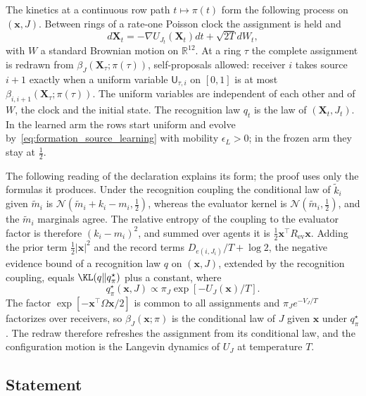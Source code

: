 \begin{definition}
The kinetics at a continuous row path $t\mapsto\pi(t)$ form the following process on $(\mathbf x,J)$. Between rings of a rate-one Poisson clock the assignment is held and
\[
d\mathbf X_t=-\nabla U_{J_t}(\mathbf X_t)dt+\sqrt{2T}dW_t,
\]
with $W$ a standard Brownian motion on $\mathbb R^{12}$. At a ring $\tau$ the complete assignment is redrawn from $\beta_J(\mathbf X_\tau;\pi(\tau))$, self-proposals allowed: receiver $i$ takes source $i+1$ exactly when a uniform variable $\mathsf U_{\tau,i}$ on $[0,1]$ is at most $\beta_{i,i+1}(\mathbf X_\tau;\pi(\tau))$. The uniform variables are independent of each other and of $W$, the clock and the initial state. The recognition law $q_t$ is the law of $(\mathbf X_t,J_t)$. In the learned arm the rows start uniform and evolve by~\eqref{eq:formation_source_learning} with mobility $\epsilon_L>0$; in the frozen arm they stay at $\frac12$.
\end{definition}

The following reading of the declaration explains its form; the proof uses only the formulas it produces. Under the recognition coupling the conditional law of $\tilde k_i$ given $\tilde m_i$ is $\mathcal N(\tilde m_i+k_i-m_i,\frac12)$, whereas the evaluator kernel is $\mathcal N(\tilde m_i,\frac12)$, and the $\tilde m_i$ marginals agree. The relative entropy of the coupling to the evaluator factor is therefore $(k_i-m_i)^2$, and summed over agents it is $\frac12\mathbf x^\top R_{\mathrm{ev}}\mathbf x$. Adding the prior term $\frac12|\mathbf x|^2$ and the record terms $D_{e(i,J_i)}/T+\log2$, the negative evidence bound of a recognition law $q$ on $(\mathbf x,J)$, extended by the recognition coupling, equals $\KL(q\Vert q^\star_\pi)$ plus a constant, where
\[
q^\star_\pi(\mathbf x,J)\propto\pi_J\exp[-U_J(\mathbf x)/T].
\]
The factor $\exp[-\mathbf x^\top\Omega\mathbf x/2]$ is common to all assignments and $\pi_Je^{-V_J/T}$ factorizes over receivers, so $\beta_J(\mathbf x;\pi)$ is the conditional law of $J$ given $\mathbf x$ under $q^\star_\pi$. The redraw therefore refreshes the assignment from its conditional law, and the configuration motion is the Langevin dynamics of $U_J$ at temperature $T$.

\subsection{Statement}\label{app:sel_statement}

